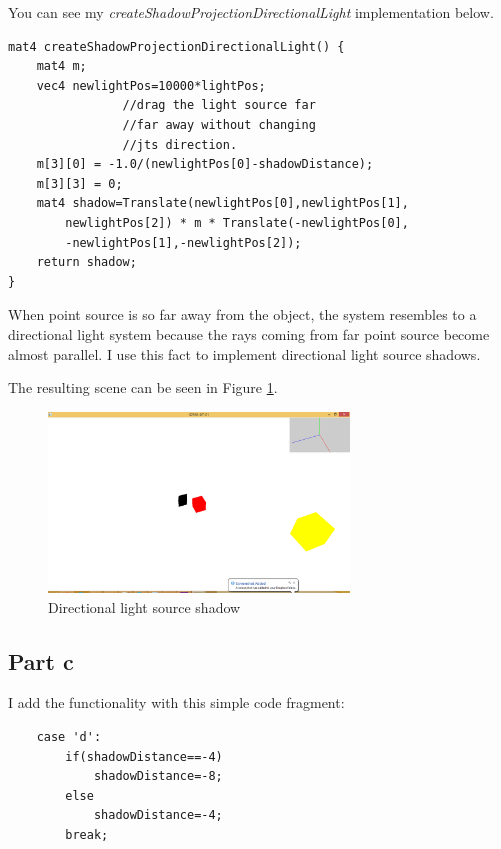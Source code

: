 You can see my \emph{createShadowProjectionDirectionalLight } implementation below.\\

\begin{lstlisting}
mat4 createShadowProjectionDirectionalLight() {
	mat4 m;
	vec4 newlightPos=10000*lightPos;
                //drag the light source far 
                //far away without changing
                //jts direction.
	m[3][0] = -1.0/(newlightPos[0]-shadowDistance);
	m[3][3] = 0;
 	mat4 shadow=Translate(newlightPos[0],newlightPos[1], 
        newlightPos[2]) * m * Translate(-newlightPos[0],
        -newlightPos[1],-newlightPos[2]);
	return shadow;	
}
\end{lstlisting}

When point source is so far away from the object, the system resembles to a directional light system because the rays coming from far point source become almost parallel. I use this fact to implement directional light source shadows.

The resulting scene can be seen in Figure \ref{fig:7-1-2}.

\begin{figure}[hp]
\centering
\includegraphics[width=8cm]{../Screenshots/ex-7/1-2.png}
\caption{Directional light source shadow}
\label{fig:7-1-2}
\end{figure} 


\subsection{Part c}
I add the functionality with this simple code fragment:\\
\begin{lstlisting}
	case 'd':
		if(shadowDistance==-4)
			shadowDistance=-8;
		else
			shadowDistance=-4;
		break;
\end{lstlisting}
